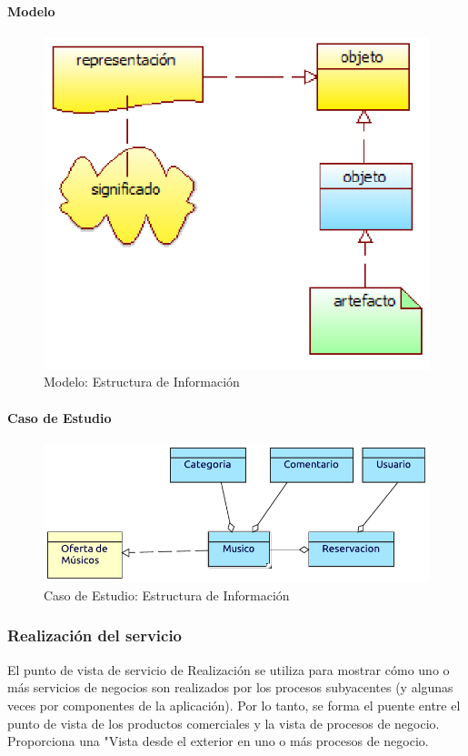 \paragraph{Modelo}
\begin{figure}[h!]
	\centering
	\includegraphics[width=0.8\linewidth]{Desarrollo/ArquitecturaEmpresarial/Tecnologia/imgs/estructuraMetamodelo.PNG}
	\caption{Modelo: Estructura de Información}
\end{figure}
\newpage
\paragraph{Caso de Estudio}

\begin{figure}[h!]
	\centering
	\includegraphics[width=\linewidth]{Desarrollo/ArquitecturaEmpresarial/Tecnologia/imgs/estructura.pdf}
	\caption{Caso de Estudio: Estructura de Información}
\end{figure}

\newpage

\subsubsection{Realización del servicio}
El punto de vista de servicio de Realización se utiliza para mostrar cómo uno o más servicios de negocios son realizados por los procesos subyacentes (y algunas veces por componentes de la aplicación). Por lo tanto, se forma el puente entre el punto de vista de los productos comerciales y la vista de procesos de negocio. Proporciona una "Vista desde el exterior en uno o más procesos de negocio.  \vspace{\baselineskip}

